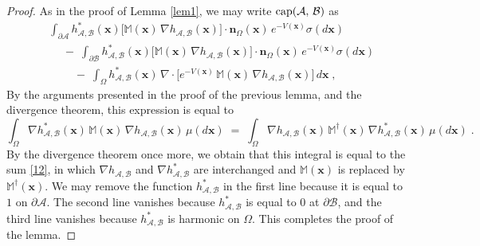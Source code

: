\documentclass[reqno]{amsart}
\newcounter{as}[section]
\newcommand{\mc}[1]{{\mathcal #1}}
\newcommand{\bb}[1]{{\mathbb #1}}
\newcommand{\bs}[1]{{\boldsymbol #1}}
\newcommand{\<}{\langle}
\renewcommand{\>}{\rangle}
\renewcommand{\Cap}{{\rm cap}}
\begin{document}
\begin{proof}
As in the proof of Lemma \ref{lem1}, we may write $\Cap (\mc A,\,\mc B)$ as
\begin{equation}
\label{12}
\begin{aligned}
& \int_{\partial \mc A} h^*_{\mc A,\mc B}(\bs{x})  \big[ \bb M(\bs{x}) \, \nabla
h_{\mc A,\mc B}(\bs{x}) \big] \cdot \bs n_{\Omega}(\bs{x})  \, e^{-V(\bs{x})} \sigma(d\bs{x}) \\
&\quad \;-\;
\int_{\partial \mc B} h^*_{\mc A,\mc B}(\bs{x}) \big[ \bb M(\bs{x}) \, \nabla
h_{\mc A,\mc B}(\bs{x}) \big] \cdot \bs n_{\Omega}(\bs{x})  \, e^{-V(\bs{x})} \sigma(d\bs{x}) \\
&\qquad \;-\;
\int_{\Omega} h^*_{\mc A,\mc B}(\bs{x}) \, \nabla \cdot \big[ e^{-V(\bs{x})} \, \bb M(\bs{x})
\, \nabla h_{\mc A,\mc B}(\bs{x}) \big] \, d\bs{x} \;,
\end{aligned}
\end{equation}
By the arguments presented in the proof of the previous lemma, and the
divergence theorem, this expression is equal to
\begin{equation*}
\int_{\Omega} \nabla h^*_{\mc A,\mc B}(\bs{x}) \,\bb M(\bs{x}) \, \nabla
h_{\mc A,\mc B}(\bs{x}) \, \mu(d\bs{x}) \;=\;
\int_{\Omega} \nabla h_{\mc A,\mc B}(\bs{x}) \,\bb M^\dagger(\bs{x}) \, \nabla
h^*_{\mc A,\mc B}(\bs{x}) \, \mu(d\bs{x}) \;.
\end{equation*}
By the divergence theorem once more, we obtain that this integral is
equal to the sum \eqref{12}, in which $\nabla h_{\mc A,\mc B}$ and $\nabla
h^*_{\mc A,\mc B}$ are interchanged and $\bb M(\bs{x})$ is replaced by $\bb
M^\dagger(\bs{x})$. We may remove the function $h^*_{\mc A,\mc B}$ in the first line
because it is equal to $1$ on $\partial \mc A$.  The second line vanishes
because $h^*_{\mc A,\mc B}$ is equal to $0$ at $\partial \mc B$, and the third line
vanishes because $h^*_{\mc A,\mc B}$ is harmonic on $\Omega$. This completes
the proof of the lemma.
\end{proof}
\end{document}
